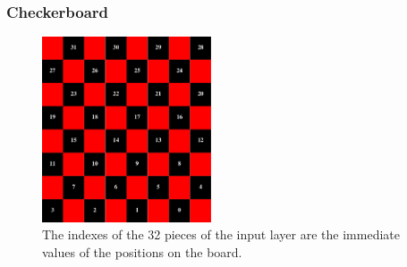 \documentclass{beamer}
\begin{document}
\begin{frame}
	\frametitle{Checkerboard}
	\begin{figure}[ht!]
		\centering
		\includegraphics[width=50mm]{checkerboard.png}
		\caption{The indexes of the 32 pieces of the input layer are the immediate values of the positions on the board. \label{overflow}}
	\end{figure}
\end{frame}
\end{document}
